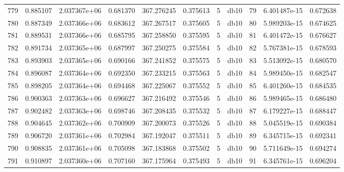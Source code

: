 \begin{tabular}{lrrrrrrlrrr}
779  &    0.885107 &        2.037367e+06 &  0.681370 &              367.276245 &    0.375613 &       5 &         db10 &     79 &   6.401487e-15 &      0.672638 \\
780  &    0.887349 &        2.037366e+06 &  0.683612 &              367.267517 &    0.375605 &       5 &         db10 &     80 &   5.989203e-15 &      0.674625 \\
781  &    0.889531 &        2.037366e+06 &  0.685795 &              367.258850 &    0.375595 &       5 &         db10 &     81 &   6.401472e-15 &      0.676627 \\
782  &    0.891734 &        2.037365e+06 &  0.687997 &              367.250275 &    0.375584 &       5 &         db10 &     82 &   5.767381e-15 &      0.678593 \\
783  &    0.893903 &        2.037365e+06 &  0.690166 &              367.241852 &    0.375575 &       5 &         db10 &     83 &   5.513092e-15 &      0.680570 \\
784  &    0.896087 &        2.037364e+06 &  0.692350 &              367.233215 &    0.375563 &       5 &         db10 &     84 &   5.989450e-15 &      0.682547 \\
785  &    0.898205 &        2.037364e+06 &  0.694468 &              367.225067 &    0.375552 &       5 &         db10 &     85 &   6.401260e-15 &      0.684535 \\
786  &    0.900363 &        2.037363e+06 &  0.696627 &              367.216492 &    0.375546 &       5 &         db10 &     86 &   5.989465e-15 &      0.686480 \\
787  &    0.902482 &        2.037363e+06 &  0.698746 &              367.208435 &    0.375532 &       5 &         db10 &     87 &   6.179227e-15 &      0.688447 \\
788  &    0.904645 &        2.037362e+06 &  0.700909 &              367.200073 &    0.375526 &       5 &         db10 &     88 &   5.045519e-15 &      0.690384 \\
789  &    0.906720 &        2.037361e+06 &  0.702984 &              367.192047 &    0.375511 &       5 &         db10 &     89 &   6.345715e-15 &      0.692341 \\
790  &    0.908835 &        2.037361e+06 &  0.705098 &              367.183868 &    0.375502 &       5 &         db10 &     90 &   5.711649e-15 &      0.694274 \\
791  &    0.910897 &        2.037360e+06 &  0.707160 &              367.175964 &    0.375493 &       5 &         db10 &     91 &   6.345761e-15 &      0.696204 \\

\end{tabular}
